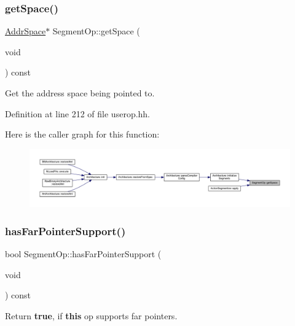 \subsubsection{\texorpdfstring{getSpace()}{getSpace()}}
{\footnotesize\ttfamily \mbox{\hyperlink{class_addr_space}{Addr\+Space}}$\ast$ Segment\+Op\+::get\+Space (\begin{DoxyParamCaption}\item[{void}]{ }\end{DoxyParamCaption}) const\hspace{0.3cm}{\ttfamily [inline]}}



Get the address space being pointed to. 



Definition at line 212 of file userop.\+hh.

Here is the caller graph for this function\+:
\nopagebreak
\begin{figure}[H]
\begin{center}
\leavevmode
\includegraphics[width=350pt]{class_segment_op_aad3d01eb19ee086071c27d3c60be0f89_icgraph}
\end{center}
\end{figure}
\mbox{\label{class_segment_op_adeed973d1e49c68202121f4173150e31}} 
\subsubsection{\texorpdfstring{hasFarPointerSupport()}{hasFarPointerSupport()}}
{\footnotesize\ttfamily bool Segment\+Op\+::has\+Far\+Pointer\+Support (\begin{DoxyParamCaption}\item[{void}]{ }\end{DoxyParamCaption}) const\hspace{0.3cm}{\ttfamily [inline]}}



Return {\bfseries{true}}, if {\bfseries{this}} op supports far pointers. 



